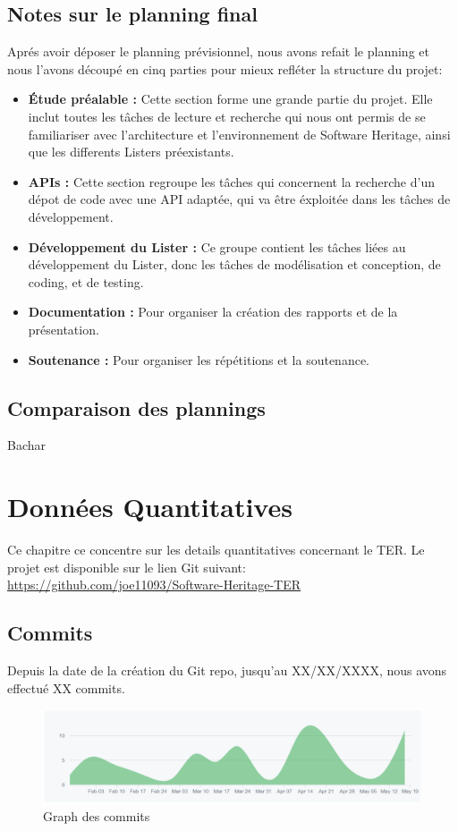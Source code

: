\documentclass[12pt,a4paper]{report}
\begin{document}
\section{Notes sur le planning final}
Aprés avoir déposer le planning prévisionnel, nous avons refait le planning et nous l'avons découpé en cinq parties pour mieux refléter la structure du projet:
\begin{itemize}
  \item \textbf{Étude préalable :} Cette section forme une grande partie du projet. Elle inclut toutes les tâches de lecture et recherche qui nous ont permis de se familiariser avec l'architecture et l'environnement de Software Heritage, ainsi que les differents Listers préexistants.
  \item \textbf{APIs :} Cette section regroupe les tâches qui concernent la recherche d'un dépot de code avec une API adaptée, qui va être éxploitée dans les tâches de développement.  
  \item \textbf{Développement du Lister :} Ce groupe contient les tâches liées au développement du Lister, donc les tâches de modélisation et conception, de coding, et de testing.
  \item \textbf{Documentation :} Pour organiser la création des rapports et de la présentation.
  \item \textbf{Soutenance :} Pour organiser les répétitions et la soutenance.
\end{itemize}

\section{Comparaison des plannings}
Bachar
\chapter{Données Quantitatives}
Ce chapitre ce concentre sur les details quantitatives concernant le TER. Le projet est disponible sur le lien Git suivant: \url{https://github.com/joe11093/Software-Heritage-TER}
\section{Commits}
Depuis la date de la création du Git repo, jusqu'au XX/XX/XXXX, nous avons effectué XX commits.

\begin{figure}[!ht]
\hspace*{-2.6cm}                
\includegraphics[scale=0.55]{images/contributor_graph_git.PNG}
\caption{Graph des commits}
\end{figure}
\end{document}
